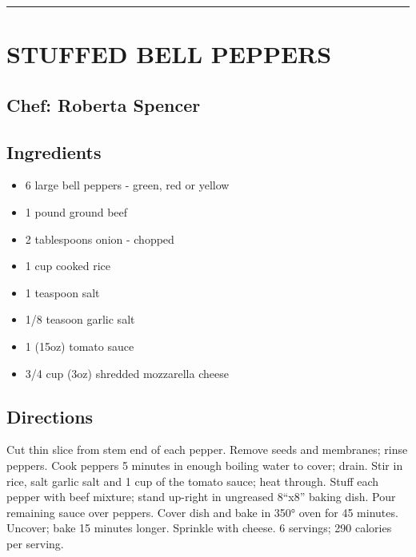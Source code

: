 \documentclass[
]{book}
\providecommand{\tightlist}{%
  \setlength{\itemsep}{0pt}\setlength{\parskip}{0pt}}
\begin{document}
\begin{center}\rule{0.5\linewidth}{0.5pt}\end{center}

\hypertarget{stuffed-bell-peppers}{%
\section*{STUFFED BELL PEPPERS}\label{stuffed-bell-peppers}}


\hypertarget{chef-roberta-spencer-23}{%
\subsection*{Chef: Roberta Spencer}\label{chef-roberta-spencer-23}}


\hypertarget{ingredients-66}{%
\subsection*{Ingredients}\label{ingredients-66}}


\begin{itemize}
\tightlist
\item
  6 large bell peppers - green, red or yellow
\item
  1 pound ground beef
\item
  2 tablespoons onion - chopped
\item
  1 cup cooked rice
\item
  1 teaspoon salt
\item
  1/8 teasoon garlic salt
\item
  1 (15oz) tomato sauce
\item
  3/4 cup (3oz) shredded mozzarella cheese
\end{itemize}

\hypertarget{directions-66}{%
\subsection*{Directions}\label{directions-66}}


Cut thin slice from stem end of each pepper. Remove seeds and membranes; rinse peppers. Cook peppers
5 minutes in enough boiling water to cover; drain. Stir in rice, salt garlic salt and 1 cup of the tomato sauce;
heat through. Stuff each pepper with beef mixture; stand up-right in ungreased 8``x8'' baking dish.
Pour remaining sauce over peppers. Cover dish and bake in 350° oven for 45 minutes. Uncover; bake 15 minutes longer.
Sprinkle with cheese. 6 servings; 290 calories per serving.
\end{document}
